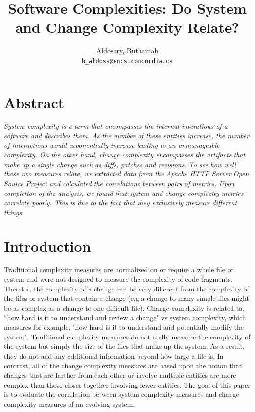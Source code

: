 \documentclass[9pt,twocolumn,a4paper]{article}
\begin{document}
\author{Aldosary, Buthainah\\
\texttt{b\_aldosa@encs.concordia.ca}}

\date{}
\title{\bf{Software Complexities: Do System and Change Complexity Relate?}}




\maketitle
\section{Abstract}
{\em System complexity is a term that encompasses the internal interations of a software and describes them. As the number of these entities increase, the number of interactions would exponentially increase leading to an unmanageable complexity. On the other hand, change complexity encompasses the artifacts that make up a single change such as diffs, patches and revisions. To see how well these two measures relate, we extracted data from the Apache HTTP Server Open Source Project and calculated the correlations between pairs of metrics. Upon completion of the analysis, we found that system and change complexity metrics correlate poorly. This is due to the fact that they exclusively measure different things.

}
\section{Introduction}

Traditional complexity measures are normalized on or require a whole file or system and were not designed to measure the complexity of code fragments. Therefor, the complexity of a change can be very different from the complexity of the files or system that contain a change (e.g a change to many simple files might be as complex as a change to one difficult file). Change complexity is related to, ``how hard is it to understand and review a change" vs system complexity, which measures for example, "how hard is it to understand and potentially modify the system". Traditional complexity measures do not really measure the complexity of the system but simply the size of the files that make up the system. As a result, they do not add any additional information beyond how large a file is. In contrast, all of the change complexity measures are based upon the notion that changes that are farther from each other or involve multiple entities are more complex than those closer together involving fewer entities. The goal of this paper is to evaluate the correlation between system complexity measures and change complexity measures of an evolving system. 
\newline
\end{document}
